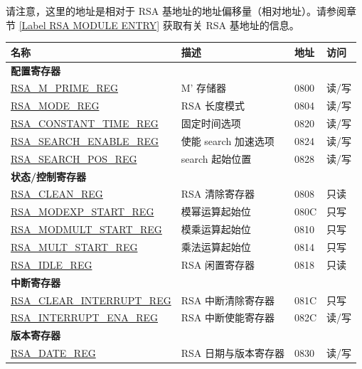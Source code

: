 
请注意，这里的地址是相对于 RSA 基地址的地址偏移量（相对地址）。请参阅章节 \ref{Label RSA MODULE ENTRY} 获取有关 RSA 基地址的信息。

\begin{longtable}{ | p{5.2cm} | p{6.6cm} | p{2cm} | p{1.2cm} | }
\hline\rowcolor{lightgray}
名称 & 描述 &  地址 & 访问 \\ \hline
\multicolumn{4}{|l|}{\textbf{配置寄存器}} \\ \hline
\hyperref[regdesc:RSAMPRIMEREG]{RSA\_M\_PRIME\_REG}                 & M' 存储器 & \hexprefix{}0800 & 读/写 \\ \hline
\hyperref[regdesc:RSAMODEREG]{RSA\_MODE\_REG}                     & RSA 长度模式      & \hexprefix{}0804 & 读/写 \\ \hline
\hyperref[regdesc:RSACONSTANTTIMEREG]{RSA\_CONSTANT\_TIME\_REG}     & 固定时间选项 & \hexprefix{}0820 & 读/写 \\ \hline
\hyperref[regdesc:RSASEARCHENABLEREG]{RSA\_SEARCH\_ENABLE\_REG}     & 使能 search 加速选项        & \hexprefix{}0824 & 读/写 \\ \hline
\hyperref[regdesc:RSASEARCHPOSREG]{RSA\_SEARCH\_POS\_REG}           & search 起始位置      & \hexprefix{}0828 & 读/写 \\ \hline
\multicolumn{4}{|l|}{\textbf{状态/控制寄存器}} \\ \hline
\hyperref[regdesc:RSACLEANREG]{RSA\_CLEAN\_REG}                 & RSA 清除寄存器               & \hexprefix{}0808 & 只读 \\ \hline
\hyperref[regdesc:RSAMODEXPSTARTREG]{RSA\_MODEXP\_START\_REG}   & 模幂运算起始位 & \hexprefix{}080C & 只写 \\ \hline
\hyperref[regdesc:RSAMODMULTSTARTREG]{RSA\_MODMULT\_START\_REG} & 模乘运算起始位 & \hexprefix{}0810 & 只写 \\ \hline
\hyperref[regdesc:RSAMULTSTARTREG]{RSA\_MULT\_START\_REG}       & 乘法运算起始位 & \hexprefix{}0814 & 只写 \\ \hline
\hyperref[regdesc:RSAIDLEREG]{RSA\_IDLE\_REG}                   & RSA 闲置寄存器                & \hexprefix{}0818 & 只读 \\ \hline
\multicolumn{4}{|l|}{\textbf{中断寄存器}} \\ \hline
\hyperref[regdesc:RSACLEARINTERRUPTREG]{RSA\_CLEAR\_INTERRUPT\_REG} & RSA 中断清除寄存器  & \hexprefix{}081C & 只写  \\ \hline
\hyperref[regdesc:RSAINTERRUPTENAREG]{RSA\_INTERRUPT\_ENA\_REG}     & RSA 中断使能寄存器 & \hexprefix{}082C & 读/写 \\ \hline
\multicolumn{4}{|l|}{\textbf{版本寄存器}} \\ \hline
\hyperref[regdesc:RSADATEREG]{RSA\_DATE\_REG}                   & RSA 日期与版本寄存器     & \hexprefix{}0830 & 读/写 \\ \hline
\end{longtable}